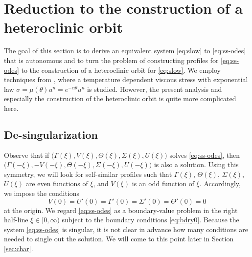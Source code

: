 \documentclass[a4paper,11pt]{article}
\def\blue{\color{blue}}
\theoremstyle{remark}
\begin{document}
\vfil\eject

\section{Reduction to the construction of a heteroclinic orbit} \label{sec:formulation}
The goal of this section is to derive an equivalent system \eqref{eq:slow} to \eqref{eq:ss-odes} that is autonomous and to turn the problem of
constructing profiles for \eqref{eq:ss-odes} to the construction of a heteroclinic orbit for \eqref{eq:slow}. We employ techniques from \cite{KOT14}, where
a temperature dependent viscous stress with exponential law $ \sigma = \mu(\theta)u^n = e^{-\alpha\theta} u^n$ is studied. However, the present
analysis and especially the construction of the heteroclinic orbit is quite more complicated here.


\subsection{De-singularization}
Observe that if $\big(\Gamma(\xi), V(\xi), \Theta(\xi), \Sigma(\xi), U(\xi)\big)$ solves \eqref{eq:ss-odes}, then 
$\big(\Gamma(-\xi), -V(-\xi), \Theta(-\xi), \Sigma(-\xi), U(-\xi)\big)$ is also a solution. 
Using this symmetry, we will look for self-similar profiles such that $\Gamma(\xi)$, $\Theta(\xi)$, $\Sigma(\xi)$, $U(\xi)$ are even functions of $\xi$, and $V(\xi)$ is an odd function of $\xi$. Accordingly, we impose the conditions
\begin{equation}
 V(0)=U'(0)=\Gamma'(0)=\Sigma'(0)=\Theta'(0)=0 \label{eq:bdry0}
\end{equation}
at the origin. We regard \eqref{eq:ss-odes} as a boundary-value problem in the right {\blue half-line} $\xi \in [0,\infty)$ subject to the boundary conditions \eqref{eq:bdry0}. Because the system \eqref{eq:ss-odes} is singular, it is not clear in {\blue advance how many conditions} are needed to single out the solution. We will come to this point later in Section \ref{sec:char}.%
\end{document}
